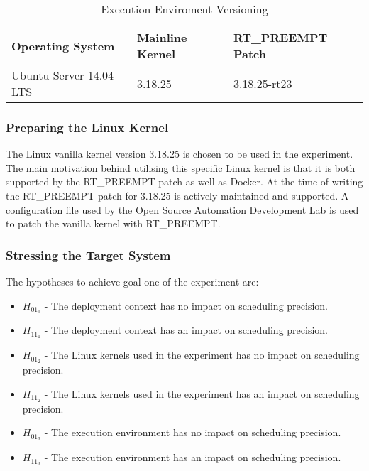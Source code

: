 \begin{table}[h]
\begin{tabular}{|l|l|l|}
\hline
\textbf{Operating System} & \textbf{Mainline Kernel} & \textbf{RT\_PREEMPT Patch} \\ \hline
Ubuntu Server 14.04 LTS     & 3.18.25                  &  3.18.25-rt23               \\ \hline
\end{tabular}
\centering
\caption{Execution Enviroment Versioning}
\label{table:execution-version}
\end{table}

\subsubsection*{Preparing the Linux Kernel}
The Linux vanilla kernel version 3.18.25 is chosen to be used in the experiment. The main motivation behind utilising this specific Linux kernel is that it is both supported by the RT\_PREEMPT patch as well as Docker. At the time of writing the RT\_PREEMPT patch for 3.18.25 is actively maintained and supported. A configuration file used by the Open Source Automation Development Lab \cite{OSADL} is used to patch the vanilla kernel with RT\_PREEMPT.

\subsubsection*{Stressing the Target System}
\begin{center}\end{center}

The hypotheses to achieve goal one of the experiment are:
\begin{itemize}
\item $H_{01_{1}}$ - The deployment context has no impact on scheduling precision.
\item $H_{11_{1}}$ - The deployment context has an impact on scheduling precision.
\item $H_{01_{2}}$ - The Linux kernels used in the experiment has no impact on scheduling precision.
\item $H_{11_{2}}$ - The Linux kernels used in the experiment has an impact on scheduling precision.
\item $H_{01_{3}}$ - The execution environment has no impact on scheduling precision.
\item $H_{11_{3}}$ - The execution environment has an impact on scheduling precision.\\
\end{itemize}


